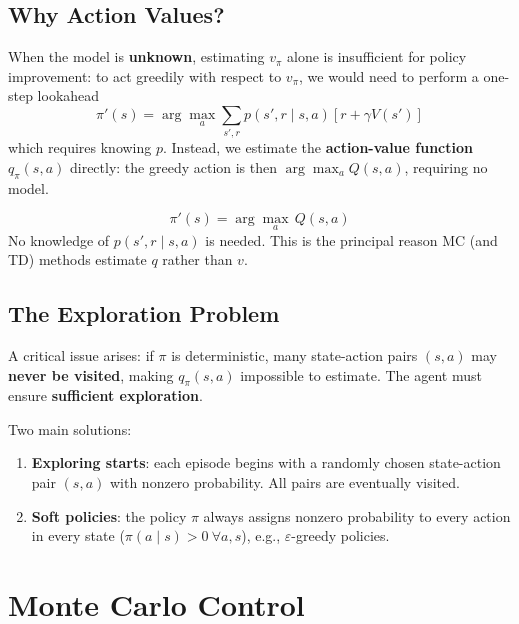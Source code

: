 \documentclass[11pt,a4paper]{article}
\theoremstyle{definition}
\theoremstyle{plain}
\theoremstyle{remark}
\begin{document}
\subsection{Why Action Values?}

When the model is \textbf{unknown}, estimating $v_\pi$ alone is insufficient for policy improvement: to act greedily with respect to $v_\pi$, we would need to perform a one-step lookahead
\[
    \pi'(s) = \arg\max_a \sum_{s', r} p(s', r \mid s, a)[r + \gamma V(s')]
\]
which requires knowing $p$. Instead, we estimate the \textbf{action-value function} $q_\pi(s, a)$ directly: the greedy action is then $\arg\max_a Q(s, a)$, requiring no model.

\begin{tcolorbox}[colback=green!5!white, colframe=green!60!black, title={Advantage of $q_\pi$ over $v_\pi$ in Model-Free Settings}]
\[
    \pi'(s) = \arg\max_a\, Q(s, a)
\]
No knowledge of $p(s', r \mid s, a)$ is needed. This is the principal reason MC (and TD) methods estimate $q$ rather than $v$.
\end{tcolorbox}

\subsection{The Exploration Problem}

A critical issue arises: if $\pi$ is deterministic, many state-action pairs $(s, a)$ may \textbf{never be visited}, making $q_\pi(s, a)$ impossible to estimate. The agent must ensure \textbf{sufficient exploration}.

Two main solutions:
\begin{enumerate}
    \item \textbf{Exploring starts}: each episode begins with a randomly chosen state-action pair $(s, a)$ with nonzero probability. All pairs are eventually visited.
    \item \textbf{Soft policies}: the policy $\pi$ always assigns nonzero probability to every action in every state ($\pi(a \mid s) > 0\ \forall a, s$), e.g., $\varepsilon$-greedy policies.
\end{enumerate}

\section{Monte Carlo Control}
\end{document}
